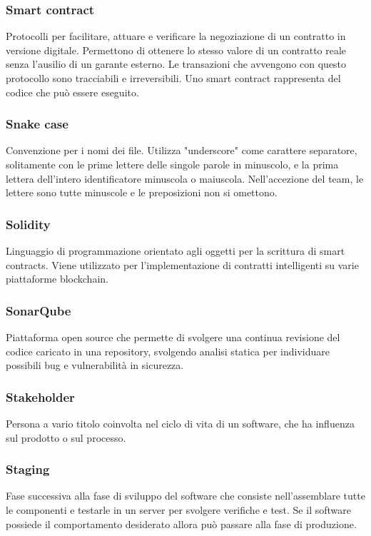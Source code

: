 \subsubsection*{Smart contract}
Protocolli per facilitare, attuare e verificare la negoziazione di un contratto in versione digitale. Permettono di ottenere lo stesso valore di un contratto reale senza l'ausilio di un garante esterno. Le transazioni che avvengono con questo protocollo sono tracciabili e irreversibili. Uno smart contract rappresenta del codice che può essere eseguito.

\subsubsection*{Snake case}
Convenzione per i nomi dei file. Utilizza "underscore" come carattere separatore, solitamente con le prime lettere delle singole parole in minuscolo, e la prima lettera dell'intero identificatore minuscola o maiuscola.
Nell'accezione del team, le lettere sono tutte minuscole e le preposizioni non si omettono.

\subsubsection*{Solidity}
Linguaggio di programmazione orientato agli oggetti per la scrittura di smart contracts\glosp. Viene utilizzato per l'implementazione di contratti intelligenti su varie piattaforme blockchain\glo.

\subsubsection*{SonarQube}
Piattaforma open source che permette di svolgere una continua revisione del codice caricato in una repository, svolgendo analisi statica per individuare possibili bug e vulnerabilità in sicurezza.

\subsubsection*{Stakeholder}
Persona a vario titolo coinvolta nel ciclo di vita di un software, che ha influenza sul prodotto o sul processo.

\subsubsection*{Staging}
Fase successiva alla fase di sviluppo del software che consiste nell'assemblare tutte le componenti e testarle in un server per svolgere verifiche e test. Se il software possiede il comportamento desiderato allora può passare alla fase di produzione.

